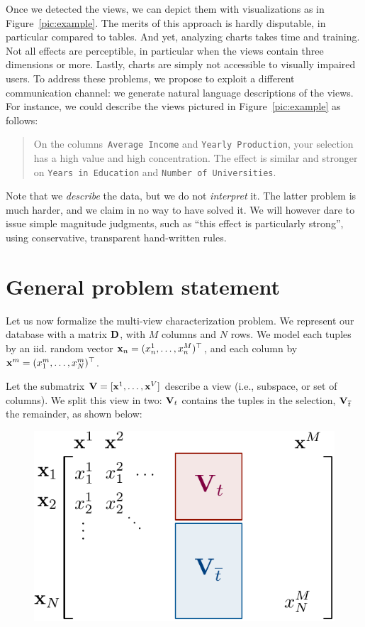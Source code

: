 Once we detected the views, we can depict them with visualizations as in
Figure~\ref{pic:example}. The merits of this approach is hardly disputable, in
particular compared to tables. And yet, analyzing charts takes time and
training. Not all effects are perceptible, in particular when the views
contain three dimensions or more. Lastly, charts are simply not accessible to
visually impaired users. To address these problems, we propose to exploit a
different communication channel: we generate natural language descriptions of
the views. For instance, we could describe the views pictured in
Figure~\ref{pic:example} as follows:
\begin{quotation}
    On the columns~\texttt{Average Income} and \texttt{Year\-ly Production},
    your selection has a high value and high concentration. The effect is
    similar and stronger on \texttt{Years in Education} and \texttt{Number of
    Universities}.
\end{quotation}
Note that we \emph{describe} the data, but we do not \emph{interpret} it. The
latter problem is much harder, and we claim in no way to have solved it. We
will however dare to issue simple ma\-gni\-tude judgments, such as ``this
effect is particularly strong'', using conservative, transparent hand-written
rules.


\section{General problem statement}
\label{sec:problem}
Let us now formalize the multi-view characterization problem. We represent our
database with a matrix $\mathbf{D}$, with $M$ columns and $N$ rows.  We model 
each tuples by an iid. random vector  $\mathbf{x}_n = (x^1_n, \dots, x^M_n)^\top$,
and each column by  $\mathbf{x}^{m}= (x^m_1, \dots, x^m_N)^\top$.

Let the submatrix $\mathbf{V}  = [\mathbf{x}^1, \dots, \mathbf{x}^V]$ describe a view
(i.e., subspace, or set of columns). We split this view in two:  ${\mathbf{V}}_t$
contains the tuples in the selection, ${\mathbf{V}}_{\overline{t}}$ the remainder,
as shown below:
\begin{figure}[h!]
  \centering
  \includegraphics[width=0.5\columnwidth]{Figures/Notations}
  \label{pic:notations}
\end{figure}


